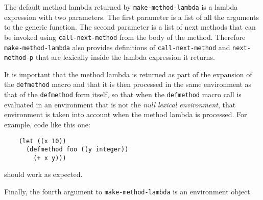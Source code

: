The default method lambda returned by \texttt{make-method-lambda} is a
lambda expression with two parameters.  The first parameter is a list
of all the arguments to the generic function.  The second parameter is
a list of next methods that can be invoked using
\texttt{call-next-method} from the body of the method.  Therefore
\texttt{make-method-lambda} also provides definitions of
\texttt{call-next-method} and \texttt{next-method-p} that are
lexically inside the lambda expression it returns.

It is important that the method lambda is returned as part of the
expansion of the \texttt{defmethod} macro and that it is then
processed in the same environment as that of the \texttt{defmethod}
form itself, so that when the \texttt{defmethod} macro call is
evaluated in an environment that is not the \emph{null lexical
  environment}, that environment is taken into account when the method
lambda is processed.  For example, code like this one:

\begin{verbatim}
    (let ((x 10))
      (defmethod foo ((y integer))
        (+ x y)))
\end{verbatim}

\noindent
should work as expected.

Finally, the fourth argument to \texttt{make-method-lambda} is an
environment object.
